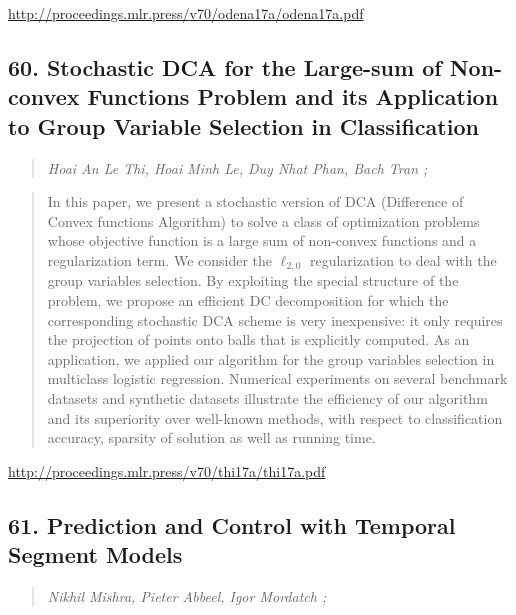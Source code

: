 \documentclass{article}
\begin{document}
\href{http://proceedings.mlr.press/v70/odena17a/odena17a.pdf}{http://proceedings.mlr.press/v70/odena17a/odena17a.pdf}

\subsection{60. Stochastic DCA for the Large-sum of Non-convex Functions Problem and its Application to Group Variable Selection in Classification}

\begin{quote}
\footnotesize{\textit{Hoai An Le Thi, Hoai Minh Le, Duy Nhat Phan, Bach Tran ;}}

\end{quote}

\begin{quote}
    In this paper, we present a stochastic version of DCA (Difference of Convex functions Algorithm) to solve a class of optimization problems whose objective function is a large sum of non-convex functions and a regularization term. We consider the $\ell_{2,0}$ regularization to deal with the group variables selection. By exploiting the special structure of the problem, we propose an efficient DC decomposition for which the corresponding stochastic DCA scheme is very inexpensive: it only requires the projection of points onto balls that is explicitly computed. As an application, we applied our algorithm for the group variables selection in multiclass logistic regression. Numerical experiments on several benchmark datasets and synthetic datasets illustrate the efficiency of our algorithm and its superiority over well-known methods, with respect to classification accuracy, sparsity of solution as well as running time.  
\end{quote}

\href{http://proceedings.mlr.press/v70/thi17a/thi17a.pdf}{http://proceedings.mlr.press/v70/thi17a/thi17a.pdf}

\subsection{61. Prediction and Control with Temporal Segment Models}

\begin{quote}
\footnotesize{\textit{Nikhil Mishra, Pieter Abbeel, Igor Mordatch ;}}

\end{quote}
\end{document}
